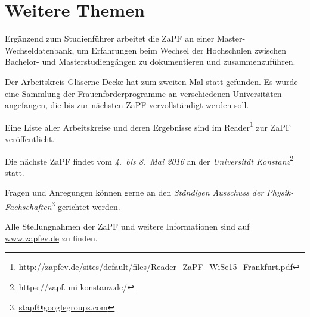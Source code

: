 \section*{Weitere Themen}
Ergänzend zum Studienführer arbeitet die ZaPF an einer Master-Wechseldatenbank,
um Erfahrungen beim Wechsel der Hochschulen zwischen Bachelor- und
Masterstudiengängen zu dokumentieren und zusammenzuführen.

Der Arbeitskreis \glqq{}Gläserne Decke\grqq{} hat zum zweiten Mal statt
gefunden. Es wurde eine Sammlung der Frauenförderprogramme an verschiedenen
Universitäten angefangen, die bis zur nächsten ZaPF vervollständigt werden
soll.

Eine Liste aller Arbeitskreise und deren Ergebnisse sind im
Reader\footnote{\href{http://zapfev.de/sites/default/files/Reader\_ZaPF\_WiSe15\_Frankfurt.pdf}{\url{http://zapfev.de/sites/default/files/Reader\_ZaPF\_WiSe15\_Frankfurt.pdf}}}
zur ZaPF veröffentlicht.

\vfill

Die nächste ZaPF findet vom \emph{4.\ bis 8.\ Mai 2016} an der  \emph{Universität Konstanz}\footnote{\href{https://zapf.uni-konstanz.de/}{\url{https://zapf.uni-konstanz.de/}}} statt.

Fragen und Anregungen können gerne an den \emph{Ständigen Ausschuss der Physik-Fachschaften}\footnote{\href{mailto:stapf@googlegroups.com}{\url{stapf@googlegroups.com}}} gerichtet werden.

Alle Stellungnahmen der ZaPF und weitere Informationen sind auf \href{http://www.zapfev.de}{\url{www.zapfev.de}} zu finden. 
